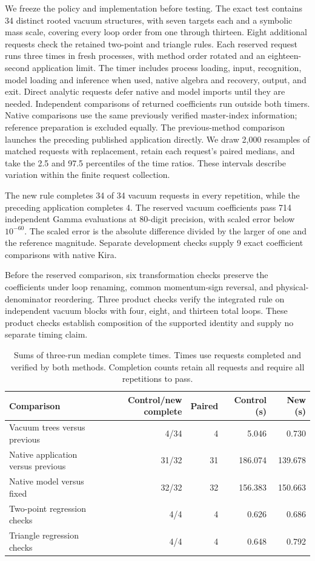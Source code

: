 We freeze the policy and implementation before testing. The exact test contains 34 distinct rooted vacuum structures, with seven targets each and a symbolic mass scale, covering every loop order from one through thirteen. Eight additional requests check the retained two-point and triangle rules. Each reserved request runs three times in fresh processes, with method order rotated and an eighteen-second application limit. The timer includes process loading, input, recognition, model loading and inference when used, native algebra and recovery, output, and exit. Direct analytic requests defer native and model imports until they are needed. Independent comparisons of returned coefficients run outside both timers. Native comparisons use the same previously verified master-index information; reference preparation is excluded equally. The previous-method comparison launches the preceding published application directly. We draw 2,000 resamples of matched requests with replacement, retain each request's paired medians, and take the 2.5 and 97.5 percentiles of the time ratios. These intervals describe variation within the finite request collection.

The new rule completes 34 of 34 vacuum requests in every repetition, while the preceding application completes 4. The reserved vacuum coefficients pass 714 independent Gamma evaluations at 80-digit precision, with scaled error below $10^{-60}$. The scaled error is the absolute difference divided by the larger of one and the reference magnitude. Separate development checks supply 9 exact coefficient comparisons with native Kira.

Before the reserved comparison, six transformation checks preserve the coefficients under loop renaming, common momentum-sign reversal, and physical-denominator reordering. Three product checks verify the integrated rule on independent vacuum blocks with four, eight, and thirteen total loops. These product checks establish composition of the supported identity and supply no separate timing claim.

\begin{table}[!htbp]\centering\small
\caption{Sums of three-run median complete times. Times use requests completed and verified by both methods. Completion counts retain all requests and require all repetitions to pass.}
\label{tab:vac-ml}
\begin{tabularx}{\linewidth}{@{}Yrrrr@{}}\toprule
Comparison & Control/new complete & Paired & Control (s) & New (s)\\\midrule
Vacuum trees versus previous & 4/34 & 4 & 5.046 & 0.730 \\
Native application versus previous & 31/32 & 31 & 186.074 & 139.678 \\
Native model versus fixed & 32/32 & 32 & 156.383 & 150.663 \\
Two-point regression checks & 4/4 & 4 & 0.626 & 0.686 \\
Triangle regression checks & 4/4 & 4 & 0.648 & 0.792 \\
\bottomrule\end{tabularx}\end{table}

